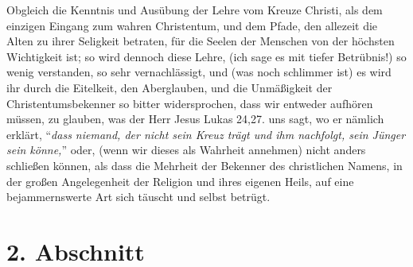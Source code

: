 Obgleich die Kenntnis und Ausübung der Lehre vom Kreuze Christi, als dem
einzigen Eingang zum wahren Christentum, und dem Pfade, den allezeit die Alten
zu ihrer Seligkeit betraten, für die Seelen der Menschen von der höchsten
Wichtigkeit ist; so wird dennoch diese Lehre, (ich sage es mit tiefer
Betrübnis!) so wenig verstanden, so sehr vernachlässigt, und (was noch
schlimmer ist) es wird ihr durch die Eitelkeit, den Aberglauben, und die
Unmäßigkeit der Christentumsbekenner so bitter widersprochen, dass wir entweder
aufhören müssen, zu glauben, was der Herr Jesus Lukas 24,27. uns sagt, wo er nämlich erklärt, "`\textit{dass
niemand, der nicht sein Kreuz trägt und ihm nachfolgt, sein Jünger sein
könne,}"' oder, (wenn wir dieses als Wahrheit annehmen) nicht anders
schließen können, als dass die Mehrheit der Bekenner des christlichen Namens, in
der großen Angelegenheit der Religion und ihres eigenen Heils, auf eine
bejammernswerte Art sich täuscht und selbst betrügt.

\section{2. Abschnitt} \label{kap1_ab2}

